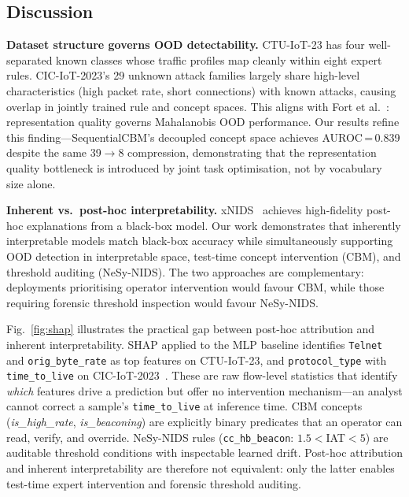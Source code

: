 \documentclass[journal]{IEEEtran}
\begin{document}
\subsection{Discussion}

\textbf{Dataset structure governs OOD detectability.}
CTU-IoT-23 has four well-separated known classes whose traffic profiles
map cleanly within eight expert rules. CIC-IoT-2023's 29 unknown attack
families largely share high-level characteristics (high packet rate,
short connections) with known attacks, causing overlap in jointly
trained rule and concept spaces. This aligns with Fort
et al.~\cite{fort2021exploring}: representation quality governs
Mahalanobis OOD performance. Our results refine this
finding---SequentialCBM's decoupled concept space achieves AUROC\,=\,0.839
despite the same 39$\to$8 compression, demonstrating that the
representation quality bottleneck is introduced by joint task
optimisation, not by vocabulary size alone.

\textbf{Inherent vs.\ post-hoc interpretability.}
xNIDS~\cite{wei2023xnids} achieves high-fidelity post-hoc explanations
from a black-box model. Our work demonstrates that inherently
interpretable models match black-box accuracy while simultaneously
supporting OOD detection in interpretable space, test-time concept
intervention (CBM), and threshold auditing (NeSy-NIDS). The two
approaches are complementary: deployments prioritising operator
intervention would favour CBM, while those requiring forensic threshold
inspection would favour NeSy-NIDS.

\begin{sloppypar}
Fig.~\ref{fig:shap} illustrates the practical gap between post-hoc
attribution and inherent interpretability. SHAP applied to the MLP
baseline identifies \texttt{Telnet} and \texttt{orig\_byte\_rate} as
top features on CTU-IoT-23, and \texttt{protocol\_type} with
\texttt{time\_to\_live} on CIC-IoT-2023~\cite{rudin2019stop}. These
are raw flow-level statistics that identify \emph{which} features
drive a prediction but offer no intervention mechanism---an analyst
cannot correct a sample's \texttt{time\_to\_live} at inference time.
CBM concepts (\textit{is\_high\_rate}, \textit{is\_beaconing}) are
explicitly binary predicates that an operator can read, verify, and
override. NeSy-NIDS rules (\texttt{cc\_hb\_beacon}: $1.5{<}$IAT$<5$)
are auditable threshold conditions with inspectable learned drift.
Post-hoc attribution and inherent interpretability are therefore not
equivalent: only the latter enables test-time expert intervention and
forensic threshold auditing.
\end{sloppypar}
\end{document}
